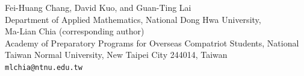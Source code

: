 \documentclass[reqno,10pt]{article}
\theoremstyle{definition}
\numberwithin{equation}{section}
\numberwithin{theorem}{section}
\begin{document}
\bigskip
\noindent Fei-Huang Chang, David Kuo, and Guan-Ting Lai\\
Department of Applied Mathematics, National Dong Hwa University,\\
Ma-Lian Chia (corresponding author) \\
Academy of Preparatory Programs for Overseas Compatriot Students,
  National Taiwan Normal University,
New Taipei City 244014, Taiwan\\
\texttt{mlchia@ntnu.edu.tw}
\end{document}
